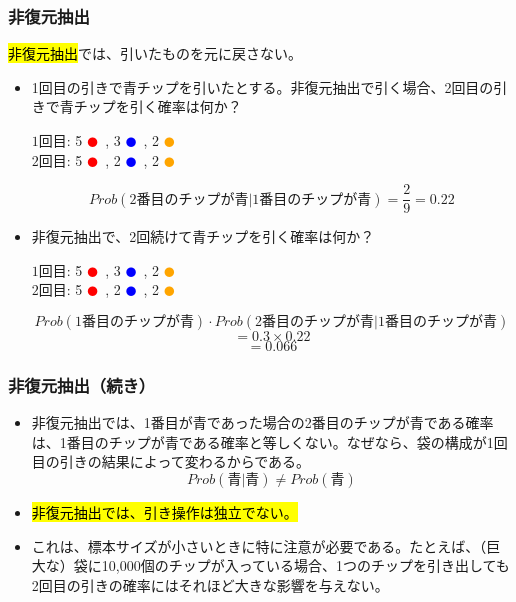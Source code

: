 
\begin{frame}
\frametitle{非復元抽出}

\hl{非復元抽出}では、引いたものを元に戻さない。

\begin{itemize}

\item 1回目の引きで青チップを引いたとする。非復元抽出で引く場合、2回目の引きで青チップを引く確率は何か？
\begin{center}
$1\text{回目}$: 5 \textcolor{red}{$\CIRCLE$}~, 3 \textcolor{blue}{$\CIRCLE$}~, 2 \textcolor{orange}{$\CIRCLE$} \\
$2\text{回目}$: 5 \textcolor{red}{$\CIRCLE$}~, 2 \textcolor{blue}{$\CIRCLE$}~, 2 \textcolor{orange}{$\CIRCLE$}
\end{center}
\[ Prob(2\text{番目のチップが青} | 1\text{番目のチップが青}) = \frac{2}{9} = 0.22 \]

\item 非復元抽出で、2回続けて青チップを引く確率は何か？
\begin{center}

$1\text{回目}$: 5 \textcolor{red}{$\CIRCLE$}~, 3 \textcolor{blue}{$\CIRCLE$}~, 2 \textcolor{orange}{$\CIRCLE$} \\
$2\text{回目}$: 5 \textcolor{red}{$\CIRCLE$}~, 2 \textcolor{blue}{$\CIRCLE$}~, 2 \textcolor{orange}{$\CIRCLE$}
\end{center}
\footnotesize
\[ Prob(1\text{番目のチップが青}) \cdot Prob(2\text{番目のチップが青} | 1\text{番目のチップが青}) \]
\[  = 0.3 \times 0.22 \]
\[ = 0.066 \]

\end{itemize}

\end{frame}


\begin{frame}
\frametitle{非復元抽出（続き）}

\begin{itemize}

\item 非復元抽出では、1番目が青であった場合の2番目のチップが青である確率は、1番目のチップが青である確率と等しくない。なぜなら、袋の構成が1回目の引きの結果によって変わるからである。
\[ Prob(\text{青} | \text{青}) \ne Prob(\text{青}) \]

\item \hl{非復元抽出では、引き操作は独立でない。}

\item これは、標本サイズが小さいときに特に注意が必要である。たとえば、（巨大な）袋に10,000個のチップが入っている場合、1つのチップを引き出しても2回目の引きの確率にはそれほど大きな影響を与えない。

\end{itemize}

\end{frame}

